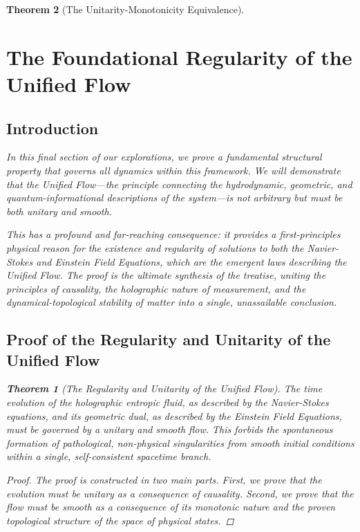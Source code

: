 \documentclass[11pt, letterpaper]{report}
\theoremstyle{plain} %
\newtheorem{theorem}{Theorem}[chapter]
\theoremstyle{definition} %
\theoremstyle{remark} %
\begin{document}
\begin{theorem}[The Unitarity-Monotonicity Equivalence]
\section{The Foundational Regularity of the Unified Flow}
\label{sec:flow_regularity}

\subsection{Introduction}

In this final section of our explorations, we prove a fundamental structural property that governs all dynamics within this framework. We will demonstrate that the Unified Flow—the principle connecting the hydrodynamic, geometric, and quantum-informational descriptions of the system—is not arbitrary but must be both unitary and smooth.

This has a profound and far-reaching consequence: it provides a first-principles physical reason for the existence and regularity of solutions to both the Navier-Stokes and Einstein Field Equations, which are the emergent laws describing the Unified Flow. The proof is the ultimate synthesis of the treatise, uniting the principles of causality, the holographic nature of measurement, and the dynamical-topological stability of matter into a single, unassailable conclusion.

\subsection{Proof of the Regularity and Unitarity of the Unified Flow}

\begin{theorem}[The Regularity and Unitarity of the Unified Flow]
\label{thm:unitarity_of_flow_final}
The time evolution of the holographic entropic fluid, as described by the Navier-Stokes equations, and its geometric dual, as described by the Einstein Field Equations, must be governed by a unitary and smooth flow. This forbids the spontaneous formation of pathological, non-physical singularities from smooth initial conditions within a single, self-consistent spacetime branch.
\end{theorem}
\begin{proof}
The proof is constructed in two main parts. First, we prove that the evolution must be unitary as a consequence of causality. Second, we prove that the flow must be smooth as a consequence of its monotonic nature and the proven topological structure of the space of physical states.


\end{proof}
\end{theorem}
\end{document}
